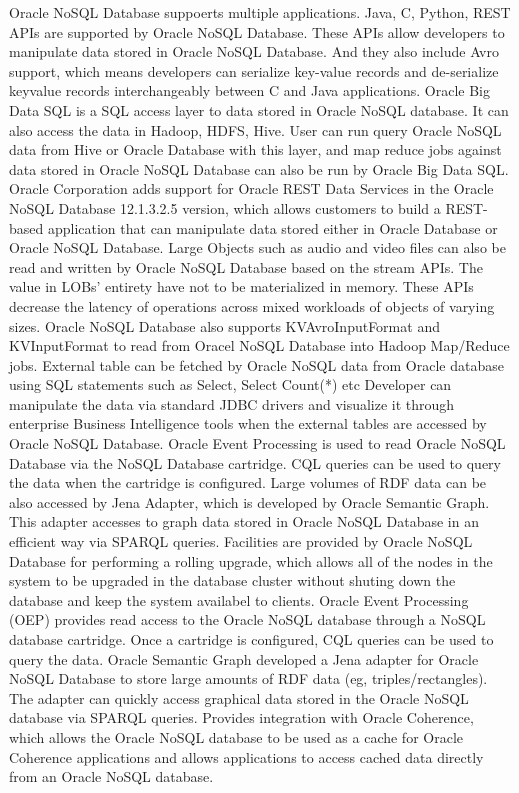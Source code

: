 Oracle NoSQL Database suppoerts multiple applications. 
Java, C, Python, REST APIs are supported by Oracle NoSQL Database. These APIs allow developers to manipulate data stored in Oracle NoSQL Database. And they also include Avro support, which means developers can serialize key-value records and de-serialize keyvalue records interchangeably between C and Java applications.\cite{hid-sp18-515-editor01}
Oracle Big Data SQL is a SQL access layer to data stored in Oracle NoSQL database. It can also access the data in Hadoop, HDFS, Hive. User can run query Oracle NoSQL data from Hive or Oracle Database with this layer, and map reduce jobs against data stored in Oracle NoSQL Database can also be run by Oracle Big Data SQL.\cite{hid-sp18-515-editor01}
Oracle Corporation adds support for Oracle REST Data Services in the Oracle NoSQL Database 12.1.3.2.5 version, which allows customers to build a REST-based application that can manipulate data stored either in Oracle Database or Oracle NoSQL Database. \cite{hid-sp18-515-editor01}
Large Objects such as audio and video files can also be read and written by Oracle NoSQL Database based on the stream APIs. The value in LOBs' entirety have not to be materialized in memory. These APIs decrease the latency of operations across mixed workloads of objects of varying sizes. 
Oracle NoSQL Database also supports KVAvroInputFormat and KVInputFormat to read from Oracel NoSQL Database into Hadoop Map/Reduce jobs. \cite{hid-sp18-515-editor01}
External table can be fetched by Oracle NoSQL data from Oracle database using SQL statements such as Select, Select Count(*) etc Developer can manipulate the data via standard JDBC drivers and visualize it through enterprise Business Intelligence tools when the external tables are accessed by Oracle NoSQL Database. 
Oracle Event Processing is used to read Oracle NoSQL Database via the NoSQL Database cartridge. CQL queries can be used to query the data when the cartridge is configured. Large volumes of RDF data can be also accessed by Jena Adapter, which is developed by Oracle Semantic Graph. This adapter accesses to graph data stored in Oracle NoSQL Database in an efficient way via SPARQL queries. \cite{hid-sp18-515-editor01}
Facilities are provided by Oracle NoSQL Database for performing a rolling upgrade, which allows all of the nodes in the system to be upgraded in the database cluster without shuting down the database and keep the system availabel to clients. \cite{hid-sp18-515-editor01}
Oracle Event Processing (OEP) provides read access to the Oracle NoSQL database through a NoSQL database cartridge. Once a cartridge is configured, CQL queries can be used to query the data. Oracle Semantic Graph developed a Jena adapter for Oracle NoSQL Database to store large amounts of RDF data (eg, triples/rectangles). The adapter can quickly access graphical data stored in the Oracle NoSQL database via SPARQL queries. Provides integration with Oracle Coherence, which allows the Oracle NoSQL database to be used as a cache for Oracle Coherence applications and allows applications to access cached data directly from an Oracle NoSQL database.
